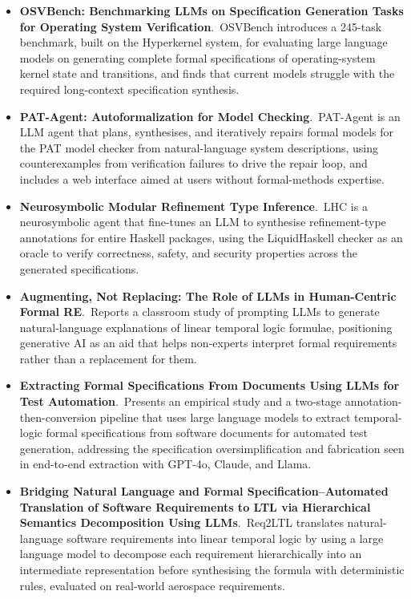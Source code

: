 \documentclass[natbib=false,acmsmall,nonacm,11pt]{acmart}
\begin{document}
\begin{itemize}
\item \textbf{OSVBench: Benchmarking LLMs on Specification Generation Tasks for Operating System Verification}.~OSVBench introduces a 245-task benchmark, built on the Hyperkernel system, for evaluating large language models on generating complete formal specifications of operating-system kernel state and transitions, and finds that current models struggle with the required long-context specification synthesis.~\cite{DBLP:conf/aaai/LiJZS26}
\item \textbf{PAT-Agent: Autoformalization for Model Checking}.~PAT-Agent is an LLM agent that plans, synthesises, and iteratively repairs formal models for the PAT model checker from natural-language system descriptions, using counterexamples from verification failures to drive the repair loop, and includes a web interface aimed at users without formal-methods expertise.~\cite{Zuo_2025}
\item \textbf{Neurosymbolic Modular Refinement Type Inference}.~LHC is a neurosymbolic agent that fine-tunes an LLM to synthesise refinement-type annotations for entire Haskell packages, using the LiquidHaskell checker as an oracle to verify correctness, safety, and security properties across the generated specifications.~\cite{DBLP:conf/icse/SakkasSOJ25}
\item \textbf{Augmenting, Not Replacing: The Role of LLMs in Human-Centric Formal RE}.~Reports a classroom study of prompting LLMs to generate natural-language explanations of linear temporal logic formulae, positioning generative AI as an aid that helps non-experts interpret formal requirements rather than a replacement for them.~\cite{DBLP:conf/re/HaliliSG25}
\item \textbf{Extracting Formal Specifications From Documents Using LLMs for Test Automation}.~Presents an empirical study and a two-stage annotation-then-conversion pipeline that uses large language models to extract temporal-logic formal specifications from software documents for automated test generation, addressing the specification oversimplification and fabrication seen in end-to-end extraction with GPT-4o, Claude, and Llama.~\cite{Li_2025}
\item \textbf{Bridging Natural Language and Formal Specification--Automated Translation of Software Requirements to LTL via Hierarchical Semantics Decomposition Using LLMs}.~Req2LTL translates natural-language software requirements into linear temporal logic by using a large language model to decompose each requirement hierarchically into an intermediate representation before synthesising the formula with deterministic rules, evaluated on real-world aerospace requirements.~\cite{MaWSLTQY25}

\end{itemize}
\end{document}
